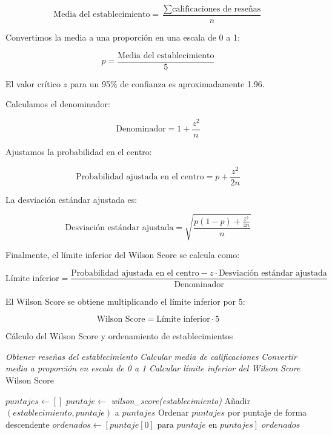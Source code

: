 \[
    \text{Media del establecimiento} = \frac{\sum \text{calificaciones de reseñas}}{n}
\]

Convertimos la media a una proporción en una escala de 0 a 1:

\[
    p = \frac{\text{Media del establecimiento}}{5}
\]

El valor crítico $z$ para un 95\% de confianza es aproximadamente 1.96.

Calculamos el denominador:

\[
    \text{Denominador} = 1 + \frac{z^2}{n}
\]

Ajustamos la probabilidad en el centro:

\[
    \text{Probabilidad ajustada en el centro} = p + \frac{z^2}{2n}
\]

La desviación estándar ajustada es:

\[
    \text{Desviación estándar ajustada} = \sqrt{\frac{p(1-p) + \frac{z^2}{4n}}{n}}
\]

Finalmente, el límite inferior del Wilson Score se calcula como:

\[
    \text{Límite inferior} = \frac{\text{Probabilidad ajustada en el centro} - z \cdot \text{Desviación estándar ajustada}}{\text{Denominador}}
\]

El Wilson Score se obtiene multiplicando el límite inferior por 5:

\[
    \text{Wilson Score} = \text{Límite inferior} \cdot 5
\]

\clearpage
\begin{algorithm}
    \caption{Cálculo del Wilson Score y ordenamiento de establecimientos}
    \label{alg:wilson_score_ordenamiento}
    \begin{algorithmic}[1]

        \State \textit{Obtener reseñas del establecimiento}
        \State \textit{Calcular media de calificaciones}
        \State \textit{Convertir media a proporción en escala de 0 a 1}
        \State \textit{Calcular límite inferior del Wilson Score}
        \State \Return Wilson Score
        \EndFunction

        \State $puntajes \leftarrow []$
        \State $puntaje \leftarrow$ \textit{wilson\_score(establecimiento)}
        \State Añadir $(establecimiento, puntaje)$ a $puntajes$
        \EndFor
        \State Ordenar $puntajes$ por puntaje de forma descendente
        \State $ordenados \leftarrow [puntaje[0] \text{ para } puntaje \text{ en } puntajes]$
        \State \Return $ordenados$
        \EndFunction
    \end{algorithmic}
\end{algorithm}

